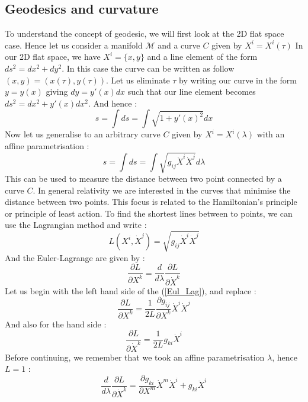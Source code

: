 \documentclass[a4paper,12pt]{article}
\theoremstyle{definition}
\begin{document}
\subsection{Geodesics and curvature}
To understand the concept of geodesic, we will first look at the 2D flat space case.
Hence let us consider a manifold $\mathcal{M}$ and a curve $C$ given by $X^i=X^i(\tau)$
In our 2D flat space, we have $X^i=\{x,y\}$ and a line element of the form $ds^2=dx^2+dy^2$.
In this case the curve can be written as follow $(x,y)=(x(\tau),y(\tau))$.
Let us eliminate $\tau$ by writing our curve in the form $y=y(x)$ giving $dy=y'(x)dx$ such that our line element becomes $ds^2=dx^2+y'(x)dx^2$.
And hence :
\begin{equation*}
	s=\int ds=\int \sqrt{1+y'(x)^2}dx
\end{equation*}
Now let us generalise to an arbitrary curve $C$ given by $X^i=X^i(\lambda)$ with an affine parametrisation :
\begin{equation*}
	s=\int ds=\int \sqrt{g_{ij}\dot{X}^i\dot{X}^j}d\lambda
\end{equation*}
This can be used to measure the distance between two point connected by a curve $C$.
In general relativity we are interested in the curves that minimise the distance between two points.
This focus is related to the Hamiltonian's principle or principle of least action.
To find the shortest lines between to points, we can use the Lagrangian method and write :
\begin{equation*}
	L(X^i,\dot{X}^j)=\sqrt{g_{ij}\dot{X}^i\dot{X}^j}
\end{equation*}
And the Euler-Lagrange are given by :
\begin{equation}\label{Eul_Lag}
	\frac{\partial L}{\partial X^k}=\frac{d}{d\lambda}\frac{\partial L}{\partial \dot{X}^k}
\end{equation}
Let us begin with the left hand side of the (\ref{Eul_Lag}), and replace :
\begin{equation*}
	\frac{\partial L}{\partial X^k}=\frac{1}{2L}\frac{\partial g_{ij}}{\partial X^k}\dot{X}^i\dot{X}^j
\end{equation*}
And also for the hand side :
\begin{equation*}
	\frac{\partial L}{\partial \dot{X}^k}=\frac{1}{2L}g_{ki}\dot{X}^i
\end{equation*}
Before continuing, we remember that we took an affine parametrisation $\lambda$, hence $L=1$ :
\begin{equation*}
	\frac{d}{d\lambda}\frac{\partial L}{\partial \dot{X}^k}=
	\frac{\partial g_{ki}}{\partial X^m}\dot{X}^m\dot{X}^i+g_{ki}\ddot{X}^i
\end{equation*}
\end{document}
